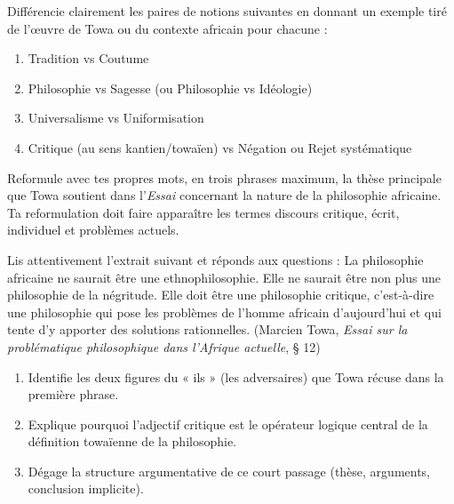 \documentclass[11pt]{article}
\newcommand{\cle}[1]{{\popxbold\color{popdark}#1}}
\newcounter{popsec}
\newcounter{popsub}
\newcommand{\courssub}[1]{%
  \stepcounter{popsub}%
  \par\vspace{9pt}\noindent{\popxbold\fontsize{11.5}{13}\selectfont\color{popink}{\color{poporange}\thepopsec.\thepopsub}\hspace{6pt}#1}\par\nopagebreak\vspace{4pt}
}
\begin{document}
\begin{exercice}
Différencie clairement les paires de notions suivantes en donnant un exemple tiré de l'œuvre de Towa ou du contexte africain pour chacune :
\begin{enumerate}
\item \cle{Tradition} vs \cle{Coutume}
\item \cle{Philosophie} vs \cle{Sagesse} (ou \cle{Philosophie} vs \cle{Idéologie})
\item \cle{Universalisme} vs \cle{Uniformisation}
\item \cle{Critique} (au sens kantien/towaïen) vs \cle{Négation} ou \cle{Rejet systématique}
\end{enumerate}
\end{exercice}

\courssub{Je m'entraîne}

\begin{exercice}
Reformule avec tes propres mots, en trois phrases maximum, la thèse principale que Towa soutient dans l'\emph{Essai} concernant la nature de la philosophie africaine. Ta reformulation doit faire apparaître les termes \cle{discours critique}, \cle{écrit}, \cle{individuel} et \cle{problèmes actuels}.
\end{exercice}

\begin{exercice}
Lis attentivement l'extrait suivant et réponds aux questions :
\guillemotleft La philosophie africaine ne saurait être une ethnophilosophie. Elle ne saurait être non plus une philosophie de la négritude. Elle doit être une philosophie critique, c'est-à-dire une philosophie qui pose les problèmes de l'homme africain d'aujourd'hui et qui tente d'y apporter des solutions rationnelles. \guillemotright (Marcien Towa, \emph{Essai sur la problématique philosophique dans l'Afrique actuelle}, § 12)

\begin{enumerate}
\item Identifie les deux figures du « ils » (les adversaires) que Towa récuse dans la première phrase.
\item Explique pourquoi l'adjectif \cle{critique} est le opérateur logique central de la définition towaïenne de la philosophie.
\item Dégage la structure argumentative de ce court passage (thèse, arguments, conclusion implicite).
\end{enumerate}
\end{exercice}
\end{document}
